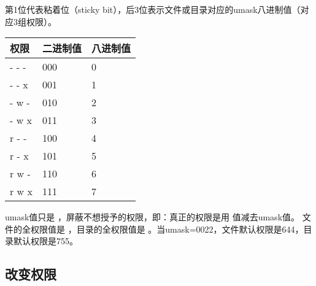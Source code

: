 \documentclass[letterpaper,10pt,english]{sphinxmanual}
\begin{document}
%
\begin{sphinxVerbatim}[commandchars=\\\{\},numbers=left,firstnumber=1,stepnumber=1]
\PYGZdl{} 

\PYGZdl{}  
\PYGZdl{} 
\end{sphinxVerbatim}

第1位代表粘着位（sticky bit），后3位表示文件或目录对应的umask八进制值（对应3组权限）。


\begin{savenotes}\sphinxattablestart
\centering
{}
\label{\detokenize{linux/03_authority:id6}}
\sphinxaftercaption
\begin{tabulary}{\linewidth}[t]{|T|T|T|}
\hline
\sphinxstyletheadfamily 
权限
&\sphinxstyletheadfamily 
二进制值
&\sphinxstyletheadfamily 
八进制值
\\
\hline
- - -
&
000
&
0
\\
\hline
- - x
&
001
&
1
\\
\hline
- w -
&
010
&
2
\\
\hline
- w x
&
011
&
3
\\
\hline
r - -
&
100
&
4
\\
\hline
r - x
&
101
&
5
\\
\hline
r w -
&
110
&
6
\\
\hline
r w x
&
111
&
7
\\
\hline
\end{tabulary}
\par
\sphinxattableend\end{savenotes}

umask值只是  ，屏蔽不想授予的权限，即：真正的权限是用  值减去umask值。
文件的全权限值是  ，目录的全权限值是  。当umask=0022，文件默认权限是644，目录默认权限是755。


\subsection{改变权限}
\label{\detokenize{linux/03_authority:id4}}
%
\begin{sphinxVerbatim}[commandchars=\\\{\}]
 \PYG{p}{[}\PYG{p}{]} \PYG{p}{[}\PYG{p}{]} \PYG{p}{[}\PYG{p}{]} \PYG{p}{[}\PYG{p}{]} \PYG{p}{[}\PYG{p}{]}
\end{sphinxVerbatim}
\end{document}
